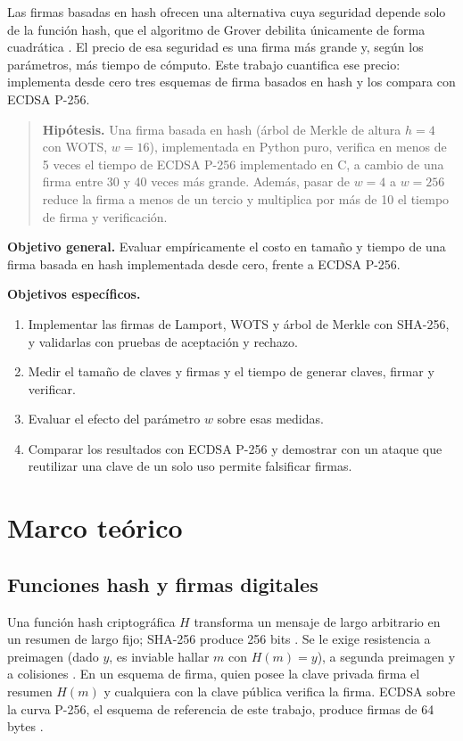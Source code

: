 \documentclass[12pt,letterpaper]{article}
\begin{document}
Las firmas basadas en hash ofrecen una alternativa cuya seguridad depende solo de la función hash, que el algoritmo de Grover debilita únicamente de forma cuadrática \parencite{grover1996}. El precio de esa seguridad es una firma más grande y, según los parámetros, más tiempo de cómputo. Este trabajo cuantifica ese precio: implementa desde cero tres esquemas de firma basados en hash y los compara con ECDSA P-256.

\begin{quote}
  \textbf{Hipótesis.} Una firma basada en hash (árbol de Merkle de altura $h=4$ con WOTS, $w=16$), implementada en Python puro, verifica en menos de 5 veces el tiempo de ECDSA P-256 implementado en C, a cambio de una firma entre 30 y 40 veces más grande. Además, pasar de $w=4$ a $w=256$ reduce la firma a menos de un tercio y multiplica por más de 10 el tiempo de firma y verificación.
\end{quote}

\textbf{Objetivo general.} Evaluar empíricamente el costo en tamaño y tiempo de una firma basada en hash implementada desde cero, frente a ECDSA P-256.

\textbf{Objetivos específicos.}
\begin{enumerate}
  \item Implementar las firmas de Lamport, WOTS y árbol de Merkle con SHA-256, y validarlas con pruebas de aceptación y rechazo.
  \item Medir el tamaño de claves y firmas y el tiempo de generar claves, firmar y verificar.
  \item Evaluar el efecto del parámetro $w$ sobre esas medidas.
  \item Comparar los resultados con ECDSA P-256 y demostrar con un ataque que reutilizar una clave de un solo uso permite falsificar firmas.
\end{enumerate}

\section{Marco teórico}
\subsection{Funciones hash y firmas digitales}
Una función hash criptográfica $H$ transforma un mensaje de largo arbitrario en un resumen de largo fijo; SHA-256 produce 256 bits \parencite{fips1804}. Se le exige resistencia a preimagen (dado $y$, es inviable hallar $m$ con $H(m)=y$), a segunda preimagen y a colisiones \parencite{paar2010}. En un esquema de firma, quien posee la clave privada firma el resumen $H(m)$ y cualquiera con la clave pública verifica la firma. ECDSA sobre la curva P-256, el esquema de referencia de este trabajo, produce firmas de 64 bytes \parencite{fips1865}.
\end{document}
